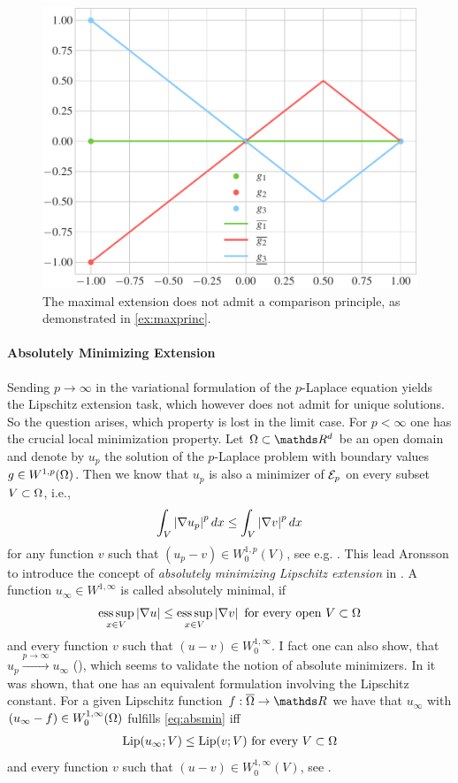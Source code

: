 %
\begin{figure}
\centering
\includegraphics[width=.5\textwidth]{code/lipextcomp/comp.pdf}
\caption{The maximal extension does not admit a comparison principle, as demonstrated in \cref{ex:maxprinc}.}\label{fig:maxprinc}
\end{figure}
%
%
\paragraph{Absolutely Minimizing Extension}\label{sec:AMLE}
%
Sending $p\to\infty$ in the variational formulation of the $p$-Laplace equation 
yields the Lipschitz extension task, which however does not admit for unique solutions. So the question arises, which property is lost in the limit case. For $p<\infty$ one has the crucial local minimization property. Let $\domain\subset\R^d$ be an open domain and denote by $u_p$ the solution of the $p$-Laplace problem with boundary values $g\in W^{1,p}(\Omega)$. Then we know that $u_p$ is also a minimizer of $\mathcal{E}_p$ on every subset $V\subset \Omega$, i.e.,
%
\begin{align*}
\int_V \left|\nabla u_p\right|^p dx \leq \int_V \left|\nabla v\right|^p dx
\end{align*}
%
for any function $v$ such that $(u_p-v)\in W^{1,p}_0(V)$, see e.g. \cite{}. This lead Aronsson to introduce the concept of \emph{absolutely minimizing Lipschitz extension} in \cite{aronsson1967extension}. A function $u_\infty\in W^{1,\infty}$ is called absolutely minimal, if
%
\begin{align}\label{eq:absmin}
\operatorname*{ess\,sup}_{x\in V} \left|\nabla u\right| \leq \operatorname*{ess\,sup}_{x\in V} \left|\nabla v\right| \text{ for every open } V\subset \Omega
\end{align}
%
and every function $v$ such that $(u-v)\in W^{1,\infty}_0$. I fact one can also show, that 
$u_p\xrightarrow{p\to\infty} u_\infty$ (\cite{aronsson1967extension}), which seems to validate the notion of absolute minimizers. 
In \cite{tour} it was shown, that one has an equivalent formulation involving the Lipschitz constant. For a given Lipschitz function $f:\overline{\domain}\to\R$ we have that $u_\infty$ with $(u_\infty-f)\in W^{1,\infty}_0(\Omega)$ fulfills \cref{eq:absmin} iff
%
\begin{align*}
\operatorname{Lip}(u_\infty; V) \leq \operatorname{Lip}(v; V) \text{ for every } V\subset \Omega
\end{align*}
%
and every function $v$ such that $(u-v)\in W^{1,\infty}_0(V)$, see \cite[Th ??]{tour}.

